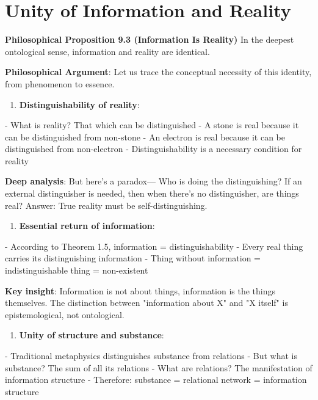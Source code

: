 \section{Unity of Information and Reality}
\label{sec:ch09_philosophy:unity-of-information-and-reality}

\textbf{Philosophical Proposition 9.3 (Information Is Reality)}
In the deepest ontological sense, information and reality are identical.

\textbf{Philosophical Argument}:
Let us trace the conceptual necessity of this identity, from phenomenon to essence.

\begin{enumerate}
\item \textbf{Distinguishability of reality}:
\end{enumerate}
   - What is reality? That which can be distinguished
   - A stone is real because it can be distinguished from non-stone
   - An electron is real because it can be distinguished from non-electron
   - Distinguishability is a necessary condition for reality
   
   \textbf{Deep analysis}: But here's a paradox---
   Who is doing the distinguishing? If an external distinguisher is needed,
   then when there's no distinguisher, are things real?
   Answer: True reality must be self-distinguishing.

\begin{enumerate}
\item \textbf{Essential return of information}:
\end{enumerate}
   - According to Theorem 1.5, information = distinguishability
   - Every real thing carries its distinguishing information
   - Thing without information = indistinguishable thing = non-existent
   
   \textbf{Key insight}: Information is not about things,
   information is the things themselves.
   The distinction between "information about X" and "X itself" is epistemological,
   not ontological.

\begin{enumerate}
\item \textbf{Unity of structure and substance}:
\end{enumerate}
   - Traditional metaphysics distinguishes substance from relations
   - But what is substance? The sum of all its relations
   - What are relations? The manifestation of information structure
   - Therefore: substance = relational network = information structure
   
